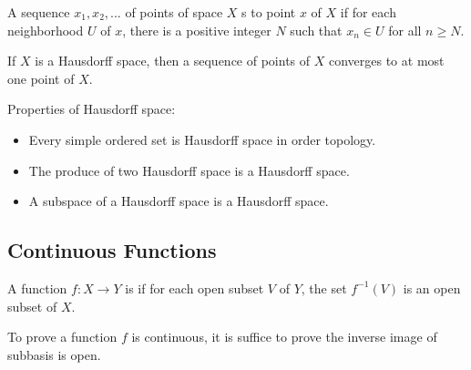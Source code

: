 \begin{definition}
    A sequence $x_1, x_2, ... $ of points of space $X$ s to point $x$ of $X$ if for each neighborhood $U$ of $x$, there is a positive integer $N$ such that $x_n \in U$ for all $n \geq N$.
\end{definition}

\begin{theorem}
If $X$ is a Hausdorff space, then a sequence of points of $X$ converges to at most one point of $X$.    
\end{theorem}

\begin{theorem}
Properties of Hausdorff space:
\begin{itemize}
    \item Every simple ordered set is Hausdorff space in order topology.
    \item The produce of two Hausdorff space is a Hausdorff space.
    \item A subspace of a Hausdorff space is a Hausdorff space. 
\end{itemize}
\end{theorem}



\subsection{Continuous Functions}


\begin{definition}
    A function $f: X \rightarrow Y$ is  if for each open subset $V$ of $Y$, the set $f^{-1}(V)$ is an open subset of $X$.
\end{definition}

To prove a function $f$ is continuous, it is suffice to prove the inverse image of subbasis is open.

